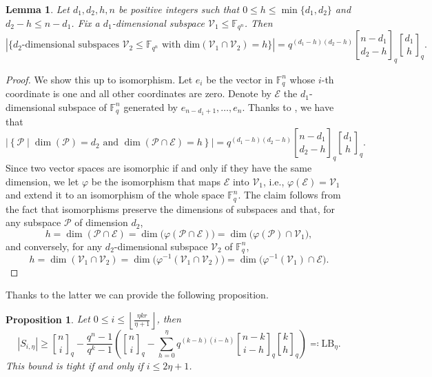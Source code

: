 \documentclass{article}
\newtheorem{lemma}{Lemma}
\newtheorem{proposition}{Proposition}
\newcommand{\Fq}{\mathbb{F}_{q}}
\newcommand{\Fqn}{\mathbb{F}_{q^n}}
\newcommand{\calE}{\mathcal{E}}
\newcommand{\calP}{\mathcal{P}}
\newcommand{\calV}{\mathcal{V}}
\newcommand{\gbinom}[2]{\genfrac{[}{]}{0pt}{}{#1}{#2}}
\begin{document}
\begin{lemma}
        \label{lemma: counting intersections}
        Let $d_1,d_2,h,n$ be positive integers such that $0\leq h\leq \min\{d_1,d_2\}$ and $d_2-h\leq n-d_1$. Fix a $d_1$-dimensional subspace $\calV_1\leq\Fqn$. Then 
        \[
        \left\lvert\{d_2\text{-dimensional subspaces }\calV_2\leq\Fqn\text{ with }\mathrm{dim}(\calV_1\cap\calV_2)=h\}\right\rvert=q^{(d_1-h)(d_2-h)}\gbinom{n-d_1}{d_2-h}_q\gbinom{d_1}{h}_q.
        \]
    \end{lemma} 
    \begin{proof}
        We show this up to isomorphism. Let $e_i$ be the vector in $\Fq^n$ whose $i$-th coordinate is one and all other coordinates are zero. Denote by $\calE$ the $d_1$-dimensional subspace of $\Fq^n$ generated by $e_{n-d_1+1},\ldots,e_n$. Thanks to \cite[Lemma 2.1]{wang2010association}, we have that
        \[
        \left\lvert\left\{\calP \mid \dim(\calP)=d_2\text{ and }\dim(\calP\cap\calE)=h\right\}\right\rvert=q^{(d_1-h)(d_2-h)}\gbinom{n-d_1}{d_2-h}_q\gbinom{d_1}{h}_q.
        \]
        Since two vector spaces are isomorphic if and only if they have the same dimension, we let $\varphi$ be the isomorphism that maps $\calE$ into $\calV_1$, i.e., $\varphi(\calE)=\calV_1$ and extend it to an isomorphism of the whole space $\Fq^n$. The claim follows from the fact that isomorphisms preserve the dimensions of subspaces and that, for any subspace $\calP$ of dimension $d_2$,
        \[
            h = \dim(\calP \cap \calE) = \dim\big(\varphi(\calP\cap \calE)\big) = \dim\big(\varphi(\calP) \cap \calV_1\big),
        \]
        and conversely, for any $d_2$-dimensional subspace  $\calV_2$ of $\mathbb{F}_q^n$,
        \[
            h = \dim(\calV_1 \cap \calV_2) = \dim\big(\varphi^{-1}(\calV_1 \cap \calV_2)\big) = \dim\big(\varphi^{-1}(\calV_1) \cap \calE\big).
        \]
    \end{proof}
    Thanks to the latter we can provide the following proposition. \begin{proposition}
        \label{ref: our lower bound}
        Let $0\leq i\leq\left\lfloor\frac{\eta kr}{\eta+1}\right\rfloor$, then
        \[
            \left\lvert S_{i,\eta}\right\rvert\geq \gbinom{n}{i}_q-\frac{q^n-1}{q^k-1}\left(\gbinom{n}{i}_q-\sum_{h=0}^\eta q^{(k-h)(i-h)}\gbinom{n-k}{i-h}_q\gbinom{k}{h}_q\right)\eqqcolon \mathrm{LB}_{\eta}.
        \]
        This bound is tight if and only if $i \leq 2 \eta + 1$.
    \end{proposition}
\end{document}
